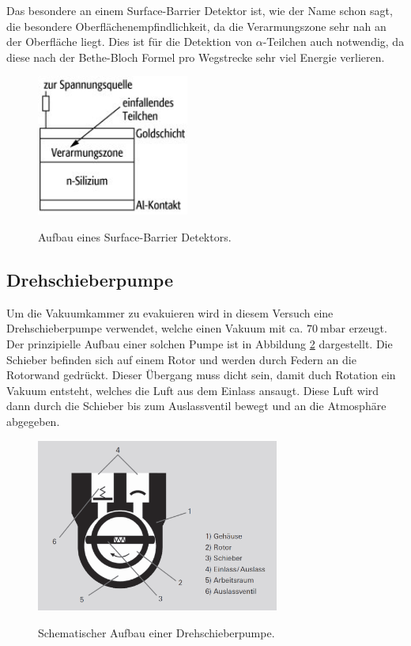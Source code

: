 Das besondere an einem Surface-Barrier Detektor ist, wie der Name schon
sagt, die besondere Oberflächenempfindlichkeit, da die Verarmungszone sehr nah an der Oberfläche liegt.
Dies ist für die Detektion von $\alpha$-Teilchen auch notwendig, da diese nach der Bethe-Bloch Formel
pro Wegstrecke sehr viel Energie verlieren.

\begin{figure}[H]
  \centering
  \includegraphics[width=5cm]{detektor.png}
  \caption{Aufbau eines Surface-Barrier Detektors.}
  \label{fig:detektor}
  \cite{detektor}
\end{figure}

\subsection{Drehschieberpumpe}
Um die Vakuumkammer zu evakuieren wird in diesem Versuch eine Drehschieberpumpe verwendet, welche
einen Vakuum mit ca. $\SI{70}{\milli\bar}$ erzeugt. Der prinzipielle Aufbau einer solchen Pumpe ist in
Abbildung \ref{fig:Drehschieber} dargestellt. Die Schieber befinden sich auf einem Rotor und werden
durch Federn an die Rotorwand gedrückt. Dieser Übergang muss dicht sein, damit duch Rotation ein
Vakuum entsteht, welches die Luft aus dem Einlass ansaugt. Diese Luft wird dann durch die Schieber
bis zum Auslassventil bewegt und an die Atmosphäre abgegeben.

\begin{figure}[H]
  \centering
  \includegraphics[width=8cm]{Drehschieber.png}
  \caption{Schematischer Aufbau einer Drehschieberpumpe.}
  \label{fig:Drehschieber}
  \cite{drehschieber}
\end{figure}
